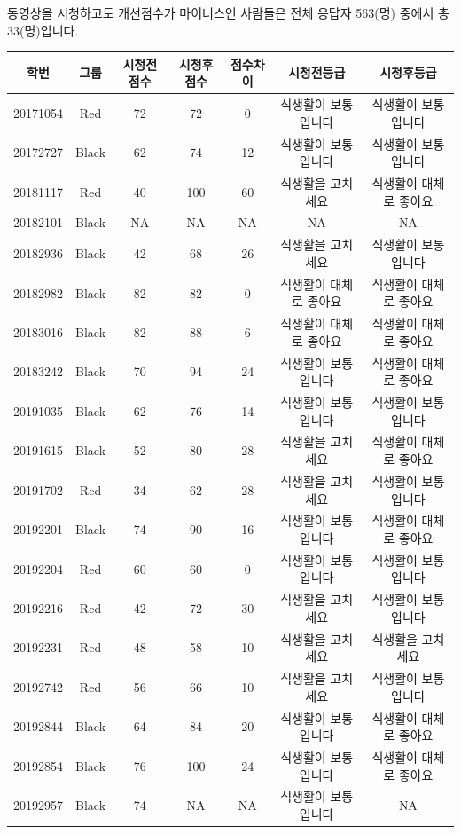 \documentclass[
]{book}
\begin{document}
동영상을 시청하고도 개선점수가 마이너스인 사람들은 전체 응답자 563(명) 중에서 총 33(명)입니다.

\begin{tabular}{c|c|c|c|c|c|c}
\hline
학번 & 그룹 & 시청전 점수 & 시청후 점수 & 점수차이 & 시청전등급 & 시청후등급\\
\hline
20171054 & Red & 72 & 72 & 0 & 식생활이 보통입니다 & 식생활이 보통입니다\\
\hline
20172727 & Black & 62 & 74 & 12 & 식생활이 보통입니다 & 식생활이 보통입니다\\
\hline
20181117 & Red & 40 & 100 & 60 & 식생활을 고치세요 & 식생활이 대체로 좋아요\\
\hline
20182101 & Black & NA & NA & NA & NA & NA\\
\hline
20182936 & Black & 42 & 68 & 26 & 식생활을 고치세요 & 식생활이 보통입니다\\
\hline
20182982 & Black & 82 & 82 & 0 & 식생활이 대체로 좋아요 & 식생활이 대체로 좋아요\\
\hline
20183016 & Black & 82 & 88 & 6 & 식생활이 대체로 좋아요 & 식생활이 대체로 좋아요\\
\hline
20183242 & Black & 70 & 94 & 24 & 식생활이 보통입니다 & 식생활이 대체로 좋아요\\
\hline
20191035 & Black & 62 & 76 & 14 & 식생활이 보통입니다 & 식생활이 보통입니다\\
\hline
20191615 & Black & 52 & 80 & 28 & 식생활을 고치세요 & 식생활이 대체로 좋아요\\
\hline
20191702 & Red & 34 & 62 & 28 & 식생활을 고치세요 & 식생활이 보통입니다\\
\hline
20192201 & Black & 74 & 90 & 16 & 식생활이 보통입니다 & 식생활이 대체로 좋아요\\
\hline
20192204 & Red & 60 & 60 & 0 & 식생활이 보통입니다 & 식생활이 보통입니다\\
\hline
20192216 & Red & 42 & 72 & 30 & 식생활을 고치세요 & 식생활이 보통입니다\\
\hline
20192231 & Red & 48 & 58 & 10 & 식생활을 고치세요 & 식생활을 고치세요\\
\hline
20192742 & Red & 56 & 66 & 10 & 식생활을 고치세요 & 식생활이 보통입니다\\
\hline
20192844 & Black & 64 & 84 & 20 & 식생활이 보통입니다 & 식생활이 대체로 좋아요\\
\hline
20192854 & Black & 76 & 100 & 24 & 식생활이 보통입니다 & 식생활이 대체로 좋아요\\
\hline
20192957 & Black & 74 & NA & NA & 식생활이 보통입니다 & NA\\

\end{tabular}
\end{document}
